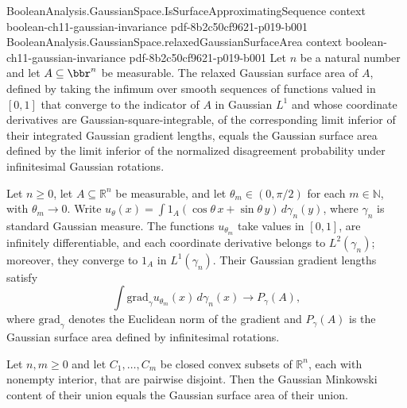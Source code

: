 \begin{theorem}
  {BooleanAnalysis.GaussianSpace.IsSurfaceApproximatingSequence}
  {context}
  {boolean-ch11-gaussian-invariance}
  {pdf-8b2c50cf9621-p019-b001}
\proofstep
  {BooleanAnalysis.GaussianSpace.relaxedGaussianSurfaceArea}
  {context}
  {boolean-ch11-gaussian-invariance}
  {pdf-8b2c50cf9621-p019-b001}
Let $n$ be a natural number and let $A\subseteq\bbr^n$ be measurable. The relaxed
Gaussian surface area of $A$, defined by taking the infimum over smooth sequences of
functions valued in $[0,1]$ that converge to the indicator of $A$ in Gaussian $L^1$ and
whose coordinate derivatives are Gaussian-square-integrable, of the corresponding limit
inferior of their integrated Gaussian gradient lengths, equals the Gaussian surface area
defined by the limit inferior of the normalized disagreement probability under
infinitesimal Gaussian rotations.
\end{theorem}

\begin{theorem}
\label{BooleanAnalysis.GaussianSpace.averagedGaussianIndicator_attains_surfaceArea}
\leanok
{}
Let $n\ge0$, let $A\subseteq\mathbb R^n$ be measurable, and let $\theta_m\in(0,\pi/2)$
for each $m\in\mathbb N$, with $\theta_m\to0$. Write $u_\theta(x)=\int
1_A(\cos\theta\,x+\sin\theta\,y)\,d\gamma_n(y)$, where $\gamma_n$ is standard Gaussian
measure. The functions $u_{\theta_m}$ take values in $[0,1]$, are infinitely
differentiable, and each coordinate derivative belongs to $L^2(\gamma_n)$; moreover,
they converge to $1_A$ in $L^1(\gamma_n)$. Their Gaussian gradient lengths satisfy
\[
\int \mathrm{grad}_\gamma u_{\theta_m}(x)\,d\gamma_n(x)\longrightarrow P_\gamma(A),
\]
where $\mathrm{grad}_\gamma$ denotes the Euclidean norm of the gradient and
$P_\gamma(A)$ is the Gaussian surface area defined by infinitesimal rotations.
\end{theorem}

\begin{theorem}
\label{BooleanAnalysis.GaussianSpace.gaussianMinkowskiContent_eq_of_finite_convex_union}
\leanok
{}
Let $n,m\ge0$ and let $C_1,\ldots,C_m$ be closed convex subsets of $\mathbb R^n$, each
with nonempty interior, that are pairwise disjoint. Then the Gaussian Minkowski content
of their union equals the Gaussian surface area of their union.
\end{theorem}

